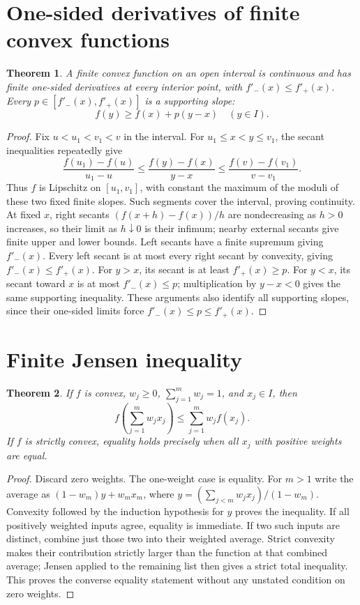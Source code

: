 \documentclass[11pt,oneside,a4paper]{book}
\newtheorem{theorem}{Theorem}[chapter]
\theoremstyle{definition}
\theoremstyle{remark}
\newcommand{\KEntry}[2]{\Needspace{7\baselineskip}\section{#2}\label{#1}{\small\sffamily\color{black!60}\detokenize{#1}}\par}
\begin{document}
\KEntry{K03.05.convex_onesided}{One-sided derivatives of finite convex functions}
\begin{theorem}
A finite convex function on an open interval is continuous and has finite one-sided derivatives at every interior point, with $f'_-(x)\le f'_+(x)$. Every $p\in[f'_-(x),f'_+(x)]$ is a supporting slope:
\[ f(y)\ge f(x)+p(y-x)\quad(y\in I). \]
\end{theorem}
\begin{proof}
Fix $u<u_1<v_1<v$ in the interval. For $u_1\le x<y\le v_1$, the secant inequalities repeatedly give
\[ \frac{f(u_1)-f(u)}{u_1-u}\le\frac{f(y)-f(x)}{y-x}\le\frac{f(v)-f(v_1)}{v-v_1}. \]
Thus $f$ is Lipschitz on $[u_1,v_1]$, with constant the maximum of the moduli of these two fixed finite slopes. Such segments cover the interval, proving continuity. At fixed $x$, right secants $(f(x+h)-f(x))/h$ are nondecreasing as $h>0$ increases, so their limit as $h\downarrow0$ is their infimum; nearby external secants give finite upper and lower bounds. Left secants have a finite supremum giving $f'_-(x)$. Every left secant is at most every right secant by convexity, giving $f'_-(x)\le f'_+(x)$. For $y>x$, its secant is at least $f'_+(x)\ge p$. For $y<x$, its secant toward $x$ is at most $f'_-(x)\le p$; multiplication by $y-x<0$ gives the same supporting inequality. These arguments also identify all supporting slopes, since their one-sided limits force $f'_-(x)\le p\le f'_+(x)$.
\end{proof}

\KEntry{K03.05.jensen}{Finite Jensen inequality}
\begin{theorem}
If $f$ is convex, $w_j\ge0$, $\sum_{j=1}^m w_j=1$, and $x_j\in I$, then
\[ f\left(\sum_{j=1}^m w_jx_j\right)\le\sum_{j=1}^m w_jf(x_j). \]
If $f$ is strictly convex, equality holds precisely when all $x_j$ with positive weights are equal.
\end{theorem}
\begin{proof}
Discard zero weights. The one-weight case is equality. For $m>1$ write the average as $(1-w_m)y+w_mx_m$, where $y=(\sum_{j<m}w_jx_j)/(1-w_m)$. Convexity followed by the induction hypothesis for $y$ proves the inequality. If all positively weighted inputs agree, equality is immediate. If two such inputs are distinct, combine just those two into their weighted average. Strict convexity makes their contribution strictly larger than the function at that combined average; Jensen applied to the remaining list then gives a strict total inequality. This proves the converse equality statement without any unstated condition on zero weights.
\end{proof}
\end{document}
